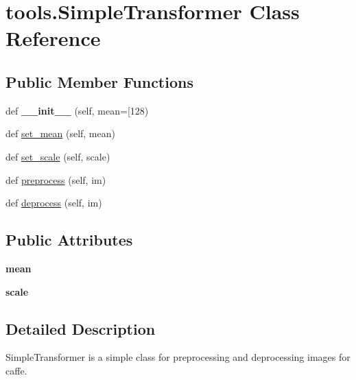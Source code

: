 \hypertarget{classtools_1_1_simple_transformer}{}\section{tools.\+Simple\+Transformer Class Reference}
\label{classtools_1_1_simple_transformer}
\subsection*{Public Member Functions}
\begin{DoxyCompactItemize}
\item 
\mbox{\label{classtools_1_1_simple_transformer_a2ebdc63cf6a92875a2a9c4ecb550017c}} 
def {\bfseries \+\_\+\+\_\+init\+\_\+\+\_\+} (self, mean=\mbox{[}128)
\item 
def \mbox{\hyperlink{classtools_1_1_simple_transformer_aead272a9fd6ba1398955cbdc0c4b1b6b}{set\+\_\+mean}} (self, mean)
\item 
def \mbox{\hyperlink{classtools_1_1_simple_transformer_aa9c52f50225c54f742e4af030db54630}{set\+\_\+scale}} (self, scale)
\item 
def \mbox{\hyperlink{classtools_1_1_simple_transformer_a9920c328a11bfe98e652c44cbe3ff004}{preprocess}} (self, im)
\item 
def \mbox{\hyperlink{classtools_1_1_simple_transformer_a4dbb3492196b4aaced34297f32e82155}{deprocess}} (self, im)
\end{DoxyCompactItemize}
\subsection*{Public Attributes}
\begin{DoxyCompactItemize}
\item 
\mbox{\label{classtools_1_1_simple_transformer_a47e9709e30e76e1d0d8bb94b54e7751c}} 
{\bfseries mean}
\item 
\mbox{\label{classtools_1_1_simple_transformer_ae9fb6225da38bbad470668734e0ea524}} 
{\bfseries scale}
\end{DoxyCompactItemize}


\subsection{Detailed Description}
\begin{DoxyVerb}SimpleTransformer is a simple class for preprocessing and deprocessing
images for caffe.
\end{DoxyVerb}
 

